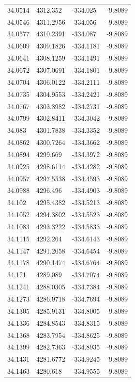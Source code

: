 \begin{table}[H]
\begin{tabular}{llll}
34.0514 & 4312.352 & -334.025 & -9.8089 \\
34.0546 & 4311.2956 & -334.056 & -9.8089 \\
34.0577 & 4310.2391 & -334.087 & -9.8089 \\
34.0609 & 4309.1826 & -334.1181 & -9.8089 \\
34.0641 & 4308.1259 & -334.1491 & -9.8089 \\
34.0672 & 4307.0691 & -334.1801 & -9.8089 \\
34.0704 & 4306.0122 & -334.2111 & -9.8089 \\
34.0735 & 4304.9553 & -334.2421 & -9.8089 \\
34.0767 & 4303.8982 & -334.2731 & -9.8089 \\
34.0799 & 4302.8411 & -334.3042 & -9.8089 \\
34.083 & 4301.7838 & -334.3352 & -9.8089 \\
34.0862 & 4300.7264 & -334.3662 & -9.8089 \\
34.0894 & 4299.669 & -334.3972 & -9.8089 \\
34.0925 & 4298.6114 & -334.4282 & -9.8089 \\
34.0957 & 4297.5538 & -334.4593 & -9.8089 \\
34.0988 & 4296.496 & -334.4903 & -9.8089 \\
34.102 & 4295.4382 & -334.5213 & -9.8089 \\
34.1052 & 4294.3802 & -334.5523 & -9.8089 \\
34.1083 & 4293.3222 & -334.5833 & -9.8089 \\
34.1115 & 4292.264 & -334.6143 & -9.8089 \\
34.1147 & 4291.2058 & -334.6454 & -9.8089 \\
34.1178 & 4290.1474 & -334.6764 & -9.8089 \\
34.121 & 4289.089 & -334.7074 & -9.8089 \\
34.1241 & 4288.0305 & -334.7384 & -9.8089 \\
34.1273 & 4286.9718 & -334.7694 & -9.8089 \\
34.1305 & 4285.9131 & -334.8005 & -9.8089 \\
34.1336 & 4284.8543 & -334.8315 & -9.8089 \\
34.1368 & 4283.7954 & -334.8625 & -9.8089 \\
34.1399 & 4282.7363 & -334.8935 & -9.8089 \\
34.1431 & 4281.6772 & -334.9245 & -9.8089 \\
34.1463 & 4280.618 & -334.9555 & -9.8089 \\

\end{tabular}
\end{table}
